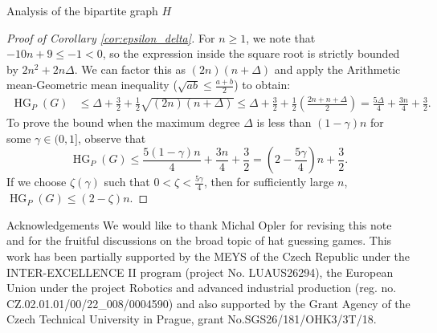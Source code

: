 \documentclass[11pt, letterpaper]{article}
\theoremstyle{plain}
\theoremstyle{plain}
\begin{document}
\begin{section}{Analysis of the bipartite graph $H$}
\begin{proof}[Proof of Corollary \ref{cor:epsilon_delta}]
For $n \ge 1$, we note that $-10n+9 \le -1 < 0$, so the expression inside the square root is strictly bounded by $2n^2 + 2n\Delta$. We can factor this as $(2n)(n+\Delta)$ and apply the Arithmetic mean-Geometric mean inequality ($\sqrt{ab} \leq \frac{a+b}{2}$) to obtain:
\begin{align*}
\operatorname{HG}_{P}(G) &\leq \Delta + \frac{3}{2} + \frac{1}{2}\sqrt{(2n)(n+\Delta)} \leq \Delta + \frac{3}{2} + \frac{1}{2}\left(\frac{2n + n + \Delta}{2}\right) = \frac{5\Delta}{4} + \frac{3n}{4} + \frac{3}{2}.
\end{align*}
    To prove the bound when the maximum degree $\Delta$ is less than $(1-\gamma)n$ for some $\gamma \in (0,1]$, observe that
    $$ \operatorname{HG}_{P}(G) \leq \frac{5(1-\gamma)n}{4} + \frac{3n}{4} + \frac{3}{2} = \left(2 - \frac{5\gamma}{4}\right)n + \frac{3}{2}. $$ 
    If we choose $\zeta(\gamma)$ such that $0 < \zeta < \frac{5\gamma}{4}$, then for sufficiently large $n$, $\operatorname{HG}_{P}(G) \leq (2-\zeta)n$.
\end{proof}
\end{section}
\begin{section}{Acknowledgements}
We would like to thank Michal Opler for revising this note and for the fruitful discussions on the broad topic of hat guessing games. This work has been partially supported by the MEYS of the Czech Republic
under the INTER-EXCELLENCE II program (project No. LUAUS26294), the European Union under the project Robotics and advanced industrial production (reg. no. CZ.02.01.01/00/22\_008/0004590) and also supported by the Grant Agency of the Czech Technical University in Prague, grant No.SGS26/181/OHK3/3T/18.
\end{section}
\printbibliography
\end{document}
